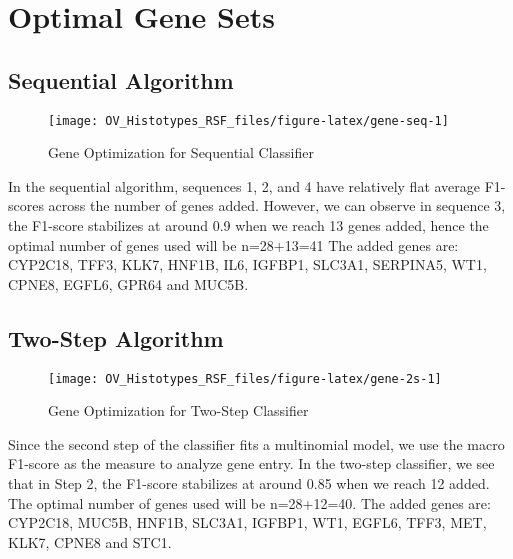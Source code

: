 \documentclass[
]{report}
\begin{document}
\hypertarget{optimal-gene-sets}{%
\section{Optimal Gene Sets}\label{optimal-gene-sets}}

\hypertarget{sequential-algorithm-1}{%
\subsection{Sequential Algorithm}\label{sequential-algorithm-1}}

\begin{figure}[H]

{\centering \texttt{[image: OV\_Histotypes\_RSF\_files/figure-latex/gene-seq-1]} 

}

\caption{Gene Optimization for Sequential Classifier}\label{fig:gene-seq}
\end{figure}

In the sequential algorithm, sequences 1, 2, and 4 have relatively flat average F1-scores across the number of genes added. However, we can observe in sequence 3, the F1-score stabilizes at around 0.9 when we reach 13 genes added, hence the optimal number of genes used will be n=28+13=41 The added genes are: CYP2C18, TFF3, KLK7, HNF1B, IL6, IGFBP1, SLC3A1, SERPINA5, WT1, CPNE8, EGFL6, GPR64 and MUC5B.

\hypertarget{two-step-algorithm-1}{%
\subsection{Two-Step Algorithm}\label{two-step-algorithm-1}}

\begin{figure}[H]

{\centering \texttt{[image: OV\_Histotypes\_RSF\_files/figure-latex/gene-2s-1]} 

}

\caption{Gene Optimization for Two-Step Classifier}\label{fig:gene-2s}
\end{figure}

Since the second step of the classifier fits a multinomial model, we use the macro F1-score as the measure to analyze gene entry. In the two-step classifier, we see that in Step 2, the F1-score stabilizes at around 0.85 when we reach 12 added. The optimal number of genes used will be n=28+12=40. The added genes are: CYP2C18, MUC5B, HNF1B, SLC3A1, IGFBP1, WT1, EGFL6, TFF3, MET, KLK7, CPNE8 and STC1.
\end{document}
